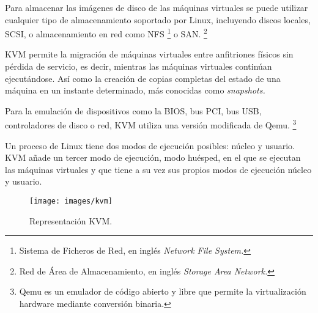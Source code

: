 \documentclass[spanisheDIVcalc,twoside,parskip-,pointlessnumbers,final]{scrbook}
\begin{document}
Para almacenar las imágenes de disco de las máquinas virtuales se
puede utilizar cualquier tipo de almacenamiento soportado por Linux,
incluyendo discos locales, SCSI, o almacenamiento en red como NFS%
\footnote{Sistema de Ficheros de Red, en inglés \emph{Network File System.}%
} o SAN.%
\footnote{Red de Área de Almacenamiento, en inglés \emph{Storage Area Network.}%
}

KVM permite la migración de máquinas virtuales entre anfitriones físicos
sin pérdida de servicio, es decir, mientras las máquinas virtuales
continúan ejecutándose. Así como la creación de copias completas del
estado de una máquina en un instante determinado, más conocidas como
\emph{snapshots.}

Para la emulación de dispositivos como la BIOS, bus PCI, bus USB,
controladores de disco o red, KVM utiliza una versión modificada de
Qemu.%
\footnote{Qemu es un emulador de código abierto y libre que permite la virtualización
hardware mediante conversión binaria.%
}

Un proceso de Linux tiene dos modos de ejecución posibles: núcleo
y usuario. KVM añade un tercer modo de ejecución, modo huésped, en
el que se ejecutan las máquinas virtuales y que tiene a su vez sus
propios modos de ejecución núcleo y usuario.

\begin{figure}[htpb]
\begin{centering}
\texttt{[image: images/kvm]}
\par\end{centering}

\caption{Representación KVM.}
\label{Representaci=0000F3n de KVM}
\end{figure}
\end{document}
